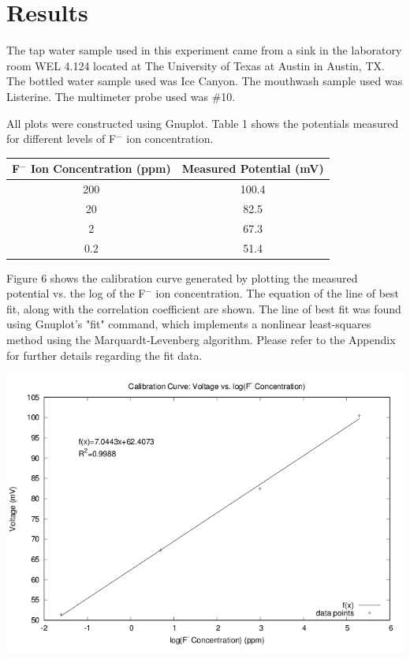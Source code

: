 \documentclass{article}
\begin{document}
\section {Results}
The tap water sample used in this experiment came from a sink in the laboratory
room WEL 4.124 located at The University of Texas at Austin in Austin, TX.
The bottled water sample used was Ice Canyon. The mouthwash sample used was
Listerine. The multimeter probe used was \#10.

All plots were constructed using Gnuplot. Table 1 shows the potentials measured
for different levels of F$^-$ ion concentration. 

\begin{center}
    \begin{tabular}{|c|c|}
        \hline
        F$^-$ Ion Concentration (ppm) & Measured Potential (mV) \\
        \hline
        200 & 100.4 \\
        20 & 82.5 \\
        2 & 67.3 \\
        0.2 & 51.4 \\
        \hline
    \end{tabular}
\end{center}

Figure 6 shows the calibration curve generated by plotting the measured
potential vs. the log of the F$^-$ ion concentration. The equation of the line of
best fit, along with the correlation coefficient are shown. The line of best fit
was found using Gnuplot's "fit" command, which implements a nonlinear
least-squares method using the Marquardt-Levenberg algorithm. Please refer to
the Appendix for further details regarding the fit data.

\begin{center}
    \includegraphics[scale=0.6]{calibration} 
\end{center}
\end{document}
